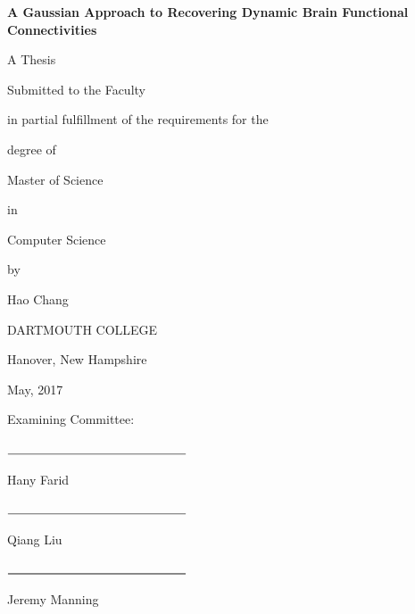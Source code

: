 \documentclass[11pt]{article}
\begin{document}
{\centering
  \textbf{A Gaussian Approach to Recovering Dynamic Brain Functional Connectivities}\par
  A Thesis\par
  Submitted to the Faculty\par
  in partial fulfillment of the requirements for the\par
  degree of\par
  Master of Science\par
  in\par
  Computer Science\par
  by\par
  Hao Chang\par
  DARTMOUTH COLLEGE\par
  Hanover, New Hampshire\par
  May, 2017\par
}
\vspace{5mm}
\setlength{\parskip}{0em}
\begin{flushright}
Examining Committee:\par
\vspace{5mm}
$\rule{5cm}{0.15mm}$\par
Hany Farid\par
\vspace{5mm}
$\rule{5cm}{0.15mm}$\par
Qiang Liu\par
\vspace{5mm}
$\rule{5cm}{0.25mm}$\par
Jeremy Manning\par
\end{flushright}
\setlength{\parskip}{1em}
\newpage


\null\par
\newpage
{}
\end{document}
